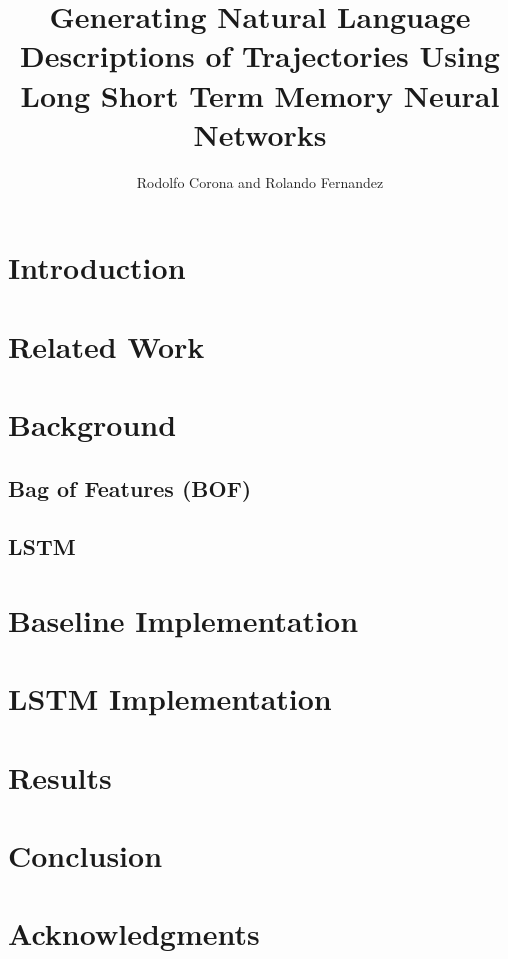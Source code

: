 \documentclass[letterpaper, 12 pt, conference]{ieeeconf}
\title{\LARGE \bf
Generating Natural Language Descriptions of Trajectories Using Long Short Term Memory Neural Networks}
\author{Rodolfo Corona and Rolando Fernandez}
\begin{document}
\maketitle
\thispagestyle{empty}
\pagestyle{empty}


\begin{abstract}

\end{abstract}

\section{Introduction}

\section{Related Work}

\section{Background}

\subsection{Bag of Features (BOF)}

\subsection{LSTM}

\section{Baseline Implementation}

\section{LSTM Implementation}

\section{Results}

\section{Conclusion}

\section{Acknowledgments}


%


\end{document}

